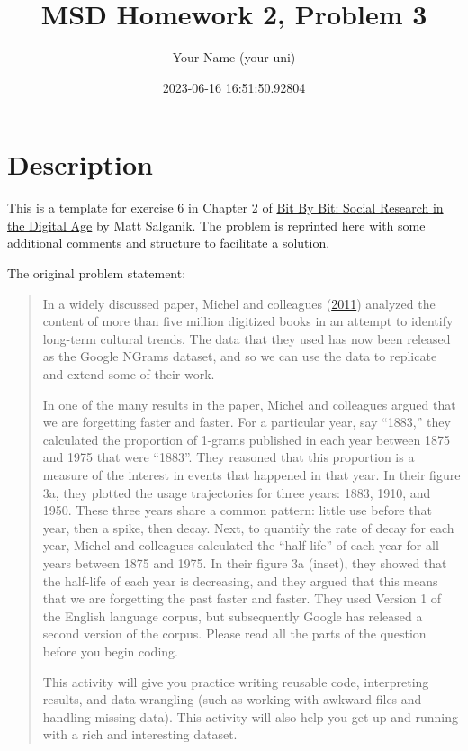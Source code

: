 \documentclass[
]{article}
\title{MSD Homework 2, Problem 3}
\author{Your Name (your uni)}
\date{2023-06-16 16:51:50.92804}
\begin{document}
\maketitle

{
\setcounter{tocdepth}{3}
\tableofcontents
}
\hypertarget{description}{%
\section{Description}\label{description}}

This is a template for exercise 6 in Chapter 2 of
\href{https://www.bitbybitbook.com/en/1st-ed/observing-behavior/observing-activities/}{Bit
By Bit: Social Research in the Digital Age} by Matt Salganik. The
problem is reprinted here with some additional comments and structure to
facilitate a solution.

The original problem statement:

\begin{quote}
In a widely discussed paper, Michel and colleagues
(\href{https://doi.org/10.1126/science.1199644}{2011}) analyzed the
content of more than five million digitized books in an attempt to
identify long-term cultural trends. The data that they used has now been
released as the Google NGrams dataset, and so we can use the data to
replicate and extend some of their work.

In one of the many results in the paper, Michel and colleagues argued
that we are forgetting faster and faster. For a particular year, say
``1883,'' they calculated the proportion of 1-grams published in each
year between 1875 and 1975 that were ``1883''. They reasoned that this
proportion is a measure of the interest in events that happened in that
year. In their figure 3a, they plotted the usage trajectories for three
years: 1883, 1910, and 1950. These three years share a common pattern:
little use before that year, then a spike, then decay. Next, to quantify
the rate of decay for each year, Michel and colleagues calculated the
``half-life'' of each year for all years between 1875 and 1975. In their
figure 3a (inset), they showed that the half-life of each year is
decreasing, and they argued that this means that we are forgetting the
past faster and faster. They used Version 1 of the English language
corpus, but subsequently Google has released a second version of the
corpus. Please read all the parts of the question before you begin
coding.

This activity will give you practice writing reusable code, interpreting
results, and data wrangling (such as working with awkward files and
handling missing data). This activity will also help you get up and
running with a rich and interesting dataset.
\end{quote}
\end{document}
